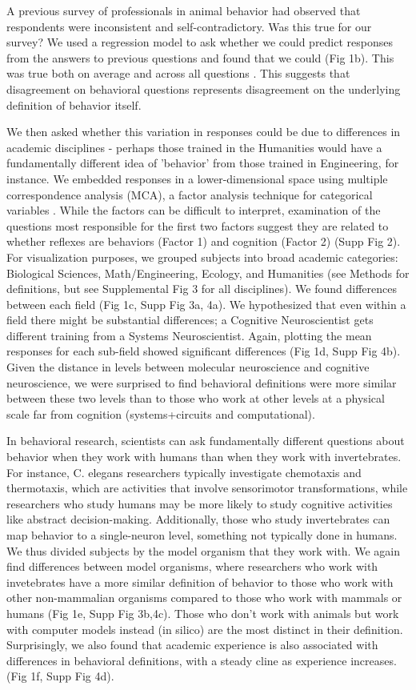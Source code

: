 \documentclass[a4paper, 11pt]{article}
\begin{document}
A previous survey of professionals in animal behavior\cite{levitis2009behavioural} had observed that respondents were inconsistent and self-contradictory. Was this true for our survey? We used a regression model to ask whether we could predict responses from the answers to previous questions and found that we could (Fig 1b). This was true both on average and across all questions . This suggests that disagreement on behavioral questions represents disagreement on the underlying definition of behavior itself.

We then asked whether this variation in responses could be due to differences in academic disciplines - perhaps those trained in the Humanities would have a fundamentally different idea of 'behavior' from those trained in Engineering, for instance. We embedded responses in a lower-dimensional space using multiple correspondence analysis (MCA), a factor analysis technique for categorical variables \cite{le2010multiple}. While the factors can be difficult to interpret, examination of the questions most responsible for the first two factors suggest they are related to whether reflexes are behaviors (Factor 1) and cognition (Factor 2) (Supp Fig 2). For visualization purposes, we grouped subjects into broad academic categories: Biological Sciences, Math/Engineering, Ecology, and Humanities (see Methods for definitions, but see Supplemental Fig 3 for all disciplines). We found differences between each field (Fig 1c, Supp Fig 3a, 4a). We  hypothesized that even within a field there might be substantial differences; a Cognitive Neuroscientist gets different training from a Systems Neuroscientist. Again, plotting the mean responses for each sub-field showed significant differences (Fig 1d, Supp Fig 4b). Given the distance in levels between molecular neuroscience and cognitive neuroscience, we were surprised to find behavioral definitions were more similar between these two levels than to those who work at other levels at a physical scale far from cognition (systems+circuits and computational).

In behavioral research, scientists can ask fundamentally different questions about behavior when they work with humans than when they work with invertebrates. For instance, C. elegans researchers typically investigate chemotaxis and thermotaxis, which are activities that involve sensorimotor transformations, while researchers who study humans may be more likely to study cognitive activities like abstract decision-making. Additionally, those who study invertebrates can map behavior to a single-neuron level, something not typically done in humans.  We thus divided subjects by the model organism that they work with. We again find differences between model organisms, where researchers who work with invetebrates have a more similar definition of behavior to those who work with other non-mammalian organisms compared to those who work with mammals or humans (Fig 1e, Supp Fig 3b,4c). Those who don't work with animals but work with computer models instead (in silico) are the most distinct in their definition. Surprisingly, we also found that academic experience is also associated with differences in behavioral definitions, with a steady cline as experience increases. (Fig 1f, Supp Fig 4d).
\end{document}
